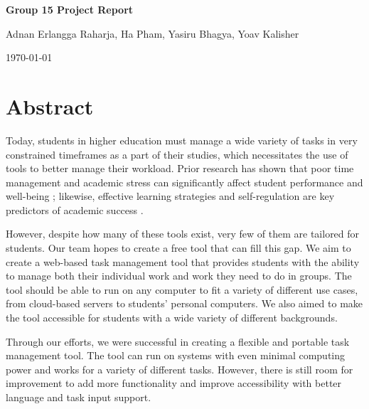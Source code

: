\documentclass[11pt,oneside]{article}
\begin{document}
\begin{titlepage}
    \centering
    \vspace*{3cm} %

    {\Huge\bfseries Group 15 Project Report\par}
    \vspace{2cm}

    {\Large Adnan Erlangga Raharja, Ha Pham, Yasiru Bhagya, Yoav Kalisher\par}
    \vspace{2cm}

    {\Large \today\par}

    \vfill
\end{titlepage}

\vspace*{3cm}

\section*{Abstract}

Today, students in higher education must manage a wide variety of tasks in very constrained timeframes as a part of their studies, which necessitates the use of tools to better manage their workload. Prior research has shown that poor time management and academic stress can significantly affect student performance and well-being \citep{misra2000college}; likewise, effective learning strategies and self-regulation are key predictors of academic success \citep{zimmerman2002becoming}.

However, despite how many of these tools exist, very few of them are tailored for students. Our team hopes to create a free tool that can fill this gap. We aim to create a web-based task management tool that provides students with the ability to manage both their individual work and work they need to do in groups. The tool should be able to run on any computer to fit a variety of different use cases, from cloud-based servers to students' personal computers. We also aimed to make the tool accessible for students with a wide variety of different backgrounds.

Through our efforts, we were successful in creating a flexible and portable task management tool. The tool can run on systems with even minimal computing power and works for a variety of different tasks. However, there is still room for improvement to add more functionality and improve accessibility with better language and task input support.
\end{document}
